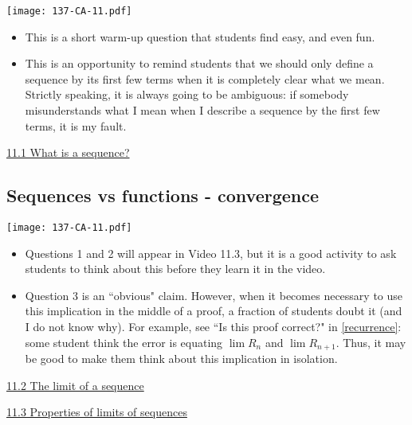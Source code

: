 \documentclass[11pt]{article}
\newcommand {\DS} [1] {${\displaystyle #1}$}
\newcommand{\nl}{\hfill \vspace{-1.1\baselineskip}} %
\newcommand{\vi}{\hspace{8mm} \href{https://www.youtube.com/watch?v=utfrtw-H9-Q&list=PLlwePzQY_wW_yFyXauToZNFNhhufzioP2}{11.1 What is a sequence?}}
\newcommand{\vii}{\hspace{8mm} \href{https://www.youtube.com/watch?v=Dr8LzBA-H84&list=PLlwePzQY_wW_yFyXauToZNFNhhufzioP2&index=2}{11.2 The limit of a sequence}}
\newcommand{\viii}{\hspace{8mm} \href{https://www.youtube.com/watch?v=xuNRMkzSzZY&list=PLlwePzQY_wW_yFyXauToZNFNhhufzioP2&index=3}{11.3 Properties of limits of sequences}}
\begin{document}
\begin{center}
{ \texttt{[image: 137-CA-11.pdf]}} 
\end{center}

\begin{comments}
\nl
	\begin{itemize}
		\item  This is a short warm-up question that students find easy, and even fun.
		\item This is an opportunity to remind students that we should only define a sequence by its first few terms when it is completely clear what we mean.  Strictly speaking, it is always going to be ambiguous: if somebody misunderstands what I mean when I describe a sequence by the first few terms, it is my fault.
	\end{itemize}
\end{comments}

\begin{videos}
\vi
\end{videos}

\newpage
\subsection{Sequences vs functions - convergence} \label{seqfun1}

\begin{center}
{ \texttt{[image: 137-CA-11.pdf]}} 
\end{center}

\begin{comments}
\nl
	\begin{itemize}
		\item   Questions 1 and 2 will appear in Video 11.3, but it is a good activity to ask students to think about this before they learn it in the video.
		\item  Question 3 is an ``obvious" claim.  However, when it becomes necessary to use this implication in the middle of a proof, a fraction of students doubt it (and I do not know why).  For example, see ``Is this proof correct?" in \autoref{recurrence}: some student think the error is equating \DS{\lim R_n} and \DS{\lim R_{n+1}}.    Thus, it may be good to make them think about this implication in isolation.
	\end{itemize}
\end{comments}

\begin{videos}
\vii

\viii
\end{videos}
\end{document}
